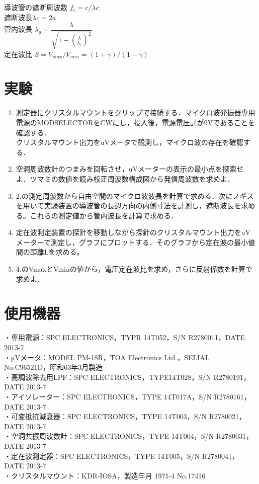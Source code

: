 導波管の遮断周波数 $f_c=c/\lambda c$\\
遮断波長$\lambda c = 2a$\\
管内波長 $\lambda_g = \dfrac{\lambda}{\sqrt{1-(\frac{\lambda}{\lambda_c})^2}}$\\
定在波比 $S=V_{max}/V_{min}=(1+\gamma)/(1-\gamma)$\\

\section{実験\label{jikken}}
\begin{enumerate}
    \item 測定器にクリスタルマウントをクリップで接続する．マイクロ波発振器専用電源のMODSELECTORをCWにし，投入後，電源電圧計が9Vであることを確認する．\\
    クリスタルマウント出力をuVメータで観測し，マイクロ波の存在を確認する．\\

    \item 空洞周波数計のつまみを回転させ，uVメーターの表示の最小点を探索せよ．ツマミの数値を読み校正周波数構成図から発信周波数を求めよ．\\

    \item 2.の測定周波数から自由空間のマイクロ波波長を計算で求める．次にノギスを用いて実験装置の導波管の長辺方向の内側寸法を計測し，遮断波長を求める。これらの測定値から管内波長を計算で求める．\\

    \item 定在波測定装置の探針を移動しながら探針のクリスタルマウント出力をuVメーターで測定し，グラフにプロットする．そのグラフから定在波の最小値間の距離Lを求める。\\

    \item 4.のVmaxとVminの値から，電圧定在波比を求め，さらに反射係数を計算で求めよ．\\
  \end{enumerate}

\newpage
\section{使用機器\label{kiki}}
・専用電源：SPC ELECTRONICS，TYPR 14T052，S/N R2780011，DATE 2013-7\\
・μVメータ：MODEL PM-18R，TOA Electronics Ltd.，SELIAL No.C96521D，昭和63年3月製造\\
・高調波除去用LPF：SPC ELECTRONICS，TYPE14T028，S/N R2780191，DATE 2013-7\\
・アイソレーター：SPC ELECTRONICS，TYPE 14T017A，S/N R2780161，DATE 2013-7\\
・可変抵抗減衰器：SPC ELECTRONICS，TYPE 14T003，S/N R2780021，DATE 2013-7\\
・空洞共振周波数計：SPC ELECTRONICS，TYPE 14T004，S/N R2780031，DATE 2013-7\\
・定在波測定器：SPC ELECTRONICS，TYPE 14T005，S/N R2780041，DATE 2013-7\\
・クリスタルマウント：KDR-IOSA，製造年月 1971-4 No.17416

